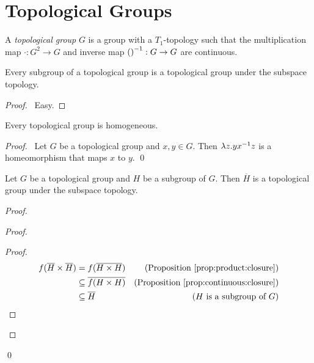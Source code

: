 \chapter{Topological Groups}

\begin{df}
  A \emph{topological group} $G$ is a group with a $T_1$-topology such that the multiplication map $\cdot : G^2 \rightarrow G$ and inverse map ${( )}^{-1} : G \rightarrow G$ are continuous.
\end{df}

\begin{prop}
  Every subgroup of a topological group is a topological group under the subspace topology.
\end{prop}

\begin{proof}
  \pf\ Easy.
\end{proof}

\begin{prop}
  Every topological group is homogeneous.
\end{prop}

\begin{proof}
  \pf\ Let $G$ be a topological group and $x, y \in G$. Then $\lambda z. y {x}^{-1} z$ is a homeomorphism that maps $x$ to $y$. \qed
\end{proof}

\begin{prop}
  Let $G$ be a topological group and $H$ be a subgroup of $G$. Then $\overline{H}$ is a topological group under the subspace topology.
\end{prop}

\begin{proof}
  \pf
  \begin{proof}
    \begin{proof}
      \pf
      \begin{align*}
        f(\overline{H} \times \overline{H}) & = f(\overline{H \times H}) & (\text{Proposition \ref{prop:product:closure}})\\
& \subseteq \overline{f(H \times H)} & (\text{Proposition \ref{prop:continuous:closure}})\\
& \subseteq \overline{H} & (\text{$H$ is a subgroup of $G$})
\end{align*}
\end{proof}
  \end{proof}
  \qed
\end{proof}

